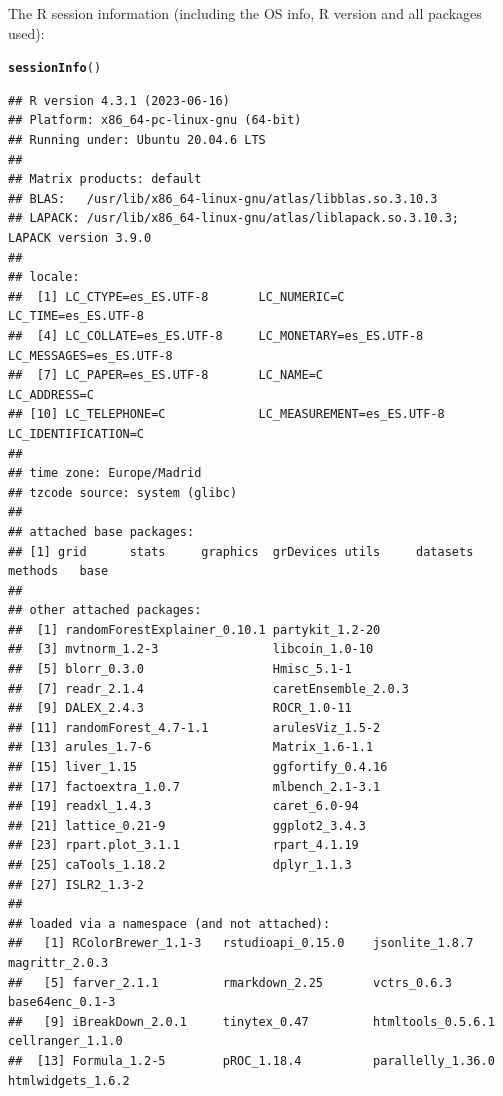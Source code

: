 \documentclass{article}\usepackage[]{graphicx}\usepackage[]{xcolor}
\makeatletter
\newcommand{\hlstd}[1]{\textcolor[rgb]{0.345,0.345,0.345}{#1}}%
\newcommand{\hlkwd}[1]{\textcolor[rgb]{0.737,0.353,0.396}{\textbf{#1}}}%
\newenvironment{kframe}{%
 \def\at@end@of@kframe{}%
 \ifinner\ifhmode%
  \def\at@end@of@kframe{\end{minipage}}%
  \begin{minipage}{\columnwidth}%
 \fi\fi%
 \def\FrameCommand##1{\hskip\@totalleftmargin \hskip-\fboxsep
 \colorbox{shadecolor}{##1}\hskip-\fboxsep
     \hskip-\linewidth \hskip-\@totalleftmargin \hskip\columnwidth}%
 \MakeFramed {\advance\hsize-\width
   \@totalleftmargin\z@ \linewidth\hsize
   \@setminipage}}%
 {\par\unskip\endMakeFramed%
 \at@end@of@kframe}
\newenvironment{knitrout}{}{} %
\makeatother
\begin{document}
The R session information (including the OS info, R version and all
packages used):

\begin{knitrout}
\color{fgcolor}\begin{kframe}
\begin{alltt}
\hlkwd{sessionInfo}\hlstd{()}
\end{alltt}
\begin{verbatim}
## R version 4.3.1 (2023-06-16)
## Platform: x86_64-pc-linux-gnu (64-bit)
## Running under: Ubuntu 20.04.6 LTS
## 
## Matrix products: default
## BLAS:   /usr/lib/x86_64-linux-gnu/atlas/libblas.so.3.10.3 
## LAPACK: /usr/lib/x86_64-linux-gnu/atlas/liblapack.so.3.10.3;  LAPACK version 3.9.0
## 
## locale:
##  [1] LC_CTYPE=es_ES.UTF-8       LC_NUMERIC=C               LC_TIME=es_ES.UTF-8       
##  [4] LC_COLLATE=es_ES.UTF-8     LC_MONETARY=es_ES.UTF-8    LC_MESSAGES=es_ES.UTF-8   
##  [7] LC_PAPER=es_ES.UTF-8       LC_NAME=C                  LC_ADDRESS=C              
## [10] LC_TELEPHONE=C             LC_MEASUREMENT=es_ES.UTF-8 LC_IDENTIFICATION=C       
## 
## time zone: Europe/Madrid
## tzcode source: system (glibc)
## 
## attached base packages:
## [1] grid      stats     graphics  grDevices utils     datasets  methods   base     
## 
## other attached packages:
##  [1] randomForestExplainer_0.10.1 partykit_1.2-20             
##  [3] mvtnorm_1.2-3                libcoin_1.0-10              
##  [5] blorr_0.3.0                  Hmisc_5.1-1                 
##  [7] readr_2.1.4                  caretEnsemble_2.0.3         
##  [9] DALEX_2.4.3                  ROCR_1.0-11                 
## [11] randomForest_4.7-1.1         arulesViz_1.5-2             
## [13] arules_1.7-6                 Matrix_1.6-1.1              
## [15] liver_1.15                   ggfortify_0.4.16            
## [17] factoextra_1.0.7             mlbench_2.1-3.1             
## [19] readxl_1.4.3                 caret_6.0-94                
## [21] lattice_0.21-9               ggplot2_3.4.3               
## [23] rpart.plot_3.1.1             rpart_4.1.19                
## [25] caTools_1.18.2               dplyr_1.1.3                 
## [27] ISLR2_1.3-2                 
## 
## loaded via a namespace (and not attached):
##   [1] RColorBrewer_1.1-3   rstudioapi_0.15.0    jsonlite_1.8.7       magrittr_2.0.3      
##   [5] farver_2.1.1         rmarkdown_2.25       vctrs_0.6.3          base64enc_0.1-3     
##   [9] iBreakDown_2.0.1     tinytex_0.47         htmltools_0.5.6.1    cellranger_1.1.0    
##  [13] Formula_1.2-5        pROC_1.18.4          parallelly_1.36.0    htmlwidgets_1.6.2   

\end{verbatim}
\end{kframe}
\end{knitrout}
\end{document}
